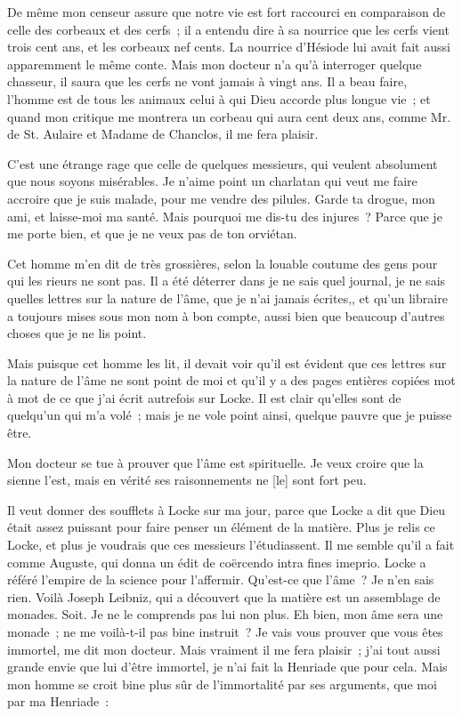 \documentclass[french,twoside]{book} %
\begin{document}
De même mon censeur assure que notre vie est fort raccourci en comparaison de celle des corbeaux et des cerfs ; il a entendu dire à sa nourrice que les cerfs vient trois cent ans, et les corbeaux nef cents. La nourrice d’Hésiode lui avait fait aussi apparemment le même conte. Mais mon docteur n’a qu’à interroger quelque chasseur, il saura que les cerfs ne vont jamais à vingt ans. Il a beau faire, l’homme est de tous les animaux celui à qui Dieu accorde plus longue vie ; et quand mon critique me montrera un corbeau qui aura cent deux ans, comme Mr. de St. Aulaire et Madame de Chanclos, il me fera plaisir. \par
C’est une étrange rage que celle de quelques messieurs, qui veulent absolument que nous soyons misérables. Je n’aime point un charlatan qui veut me faire accroire que je suis malade, pour me vendre des pilules. Garde ta drogue, mon ami, et laisse-moi ma santé. Mais pourquoi me dis-tu des injures ? Parce que je me porte bien, et que je ne veux pas de ton orviétan.\par
Cet homme m’en dit de très grossières, selon la louable coutume des gens pour qui les rieurs ne sont pas. Il a été déterrer dans je ne sais quel journal, je ne sais quelles lettres sur la nature de l’âme, que je n’ai jamais écrites,, et qu’un libraire a toujours mises sous mon nom à bon compte, aussi bien que beaucoup d’autres choses que je ne lis point.\par
Mais puisque cet homme les lit, il devait voir qu’il est évident que ces lettres sur la nature de l’âme ne sont point de moi et qu’il y a des pages entières copiées mot à mot de ce que j’ai écrit autrefois sur Locke. Il est clair qu’elles sont de quelqu’un qui m’a volé ; mais je ne vole point ainsi, quelque pauvre que je puisse être.\par
Mon docteur se tue à prouver que l’âme est spirituelle. Je veux croire que la sienne l’est, mais en vérité ses raisonnements ne [le] sont fort peu. \par
Il veut donner des soufflets à Locke sur ma jour, parce que Locke a dit que Dieu était assez puissant pour faire penser un élément de la matière. Plus je relis ce Locke, et plus je voudrais que ces messieurs l’étudiassent. Il me semble qu’il a fait comme Auguste, qui donna un édit de coërcendo intra fines imeprio. Locke a référé l’empire de la science pour l’affermir. Qu’est-ce que l’âme ? Je n’en sais rien. Voilà Joseph Leibniz, qui a découvert que la matière est un assemblage de monades. Soit. Je ne le comprends pas lui non plus. Eh bien, mon âme sera une monade ; ne me voilà-t-il pas bine instruit ? Je vais vous prouver que vous êtes immortel, me dit mon docteur. Mais vraiment il me fera plaisir ; j’ai tout aussi grande envie que lui d’être immortel, je n’ai fait la Henriade que pour cela. Mais mon homme se croit bine plus sûr de l’immortalité par ses arguments, que moi par ma Henriade : \par
\end{document}
